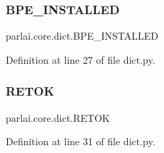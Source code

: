 \subsubsection{\texorpdfstring{B\+P\+E\+\_\+\+I\+N\+S\+T\+A\+L\+L\+ED}{BPE\_INSTALLED}}
{\footnotesize\ttfamily parlai.\+core.\+dict.\+B\+P\+E\+\_\+\+I\+N\+S\+T\+A\+L\+L\+ED}



Definition at line 27 of file dict.\+py.

\mbox{\label{namespaceparlai_1_1core_1_1dict_acc80030514561837c1010293fd1010f4}} 
\subsubsection{\texorpdfstring{R\+E\+T\+OK}{RETOK}}
{\footnotesize\ttfamily parlai.\+core.\+dict.\+R\+E\+T\+OK}



Definition at line 31 of file dict.\+py.

